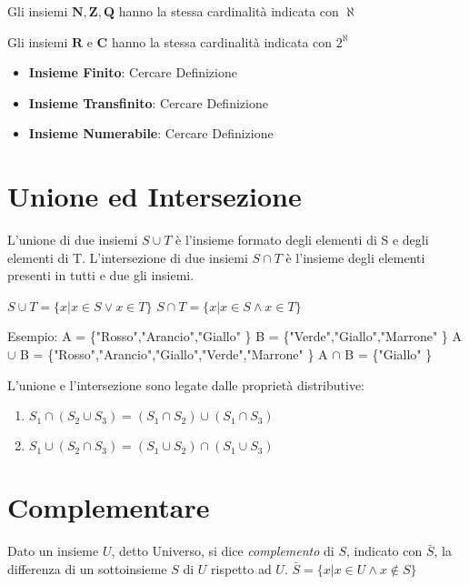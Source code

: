 Gli insiemi $\mathbf{N}, \mathbf{Z}, \mathbf{Q}$ hanno la stessa cardinalità indicata con $\aleph$

Gli insiemi $\mathbf{R}$ e $\mathbf{C}$ hanno la stessa cardinalità indicata con $ 2 ^ \aleph$

\begin{itemize}
  \item \textbf{Insieme Finito}: Cercare Definizione
  \item \textbf{Insieme Transfinito}: Cercare Definizione
  \item \textbf{Insieme Numerabile}: Cercare Definizione
\end{itemize}


\section{Unione ed Intersezione}
L'unione di due insiemi $S \cup T$ è l'insieme formato degli elementi di S e degli
elementi di T.\newline
L'intersezione di due insiemi $S \cap T$ è l'insieme degli elementi presenti in
tutti e due gli insiemi.

$S \cup T = \{x | x \in S \lor x \in T \} $ \newline
$S \cap T = \{x | x \in S \land x \in T \} $

Esempio:\newline
A = \{"Rosso","Arancio","Giallo" \} \newline
B = \{"Verde","Giallo","Marrone" \} \newline
A $\cup$ B = \{"Rosso","Arancio","Giallo","Verde","Marrone" \}
A $\cap$ B = \{"Giallo" \}

L'unione e l'intersezione sono legate dalle proprietà distributive:

\begin{enumerate}
  \item $S_1 \cap (S_2 \cup S_3) = (S_1 \cap S_2) \cup (S_1 \cap S_3)$
  \item $S_1 \cup (S_2 \cap S_3) = (S_1 \cup S_2) \cap (S_1 \cup S_3)$
\end{enumerate}

\section{Complementare}
Dato un insieme $U$, detto Universo, si dice \textit{complemento} di $S$, indicato con $\bar{S}$,
la differenza di un sottoinsieme $S$ di $U$ rispetto ad $U$.\newline
$\bar{S} = \{x | x \in U \land x \not \in S \} $

